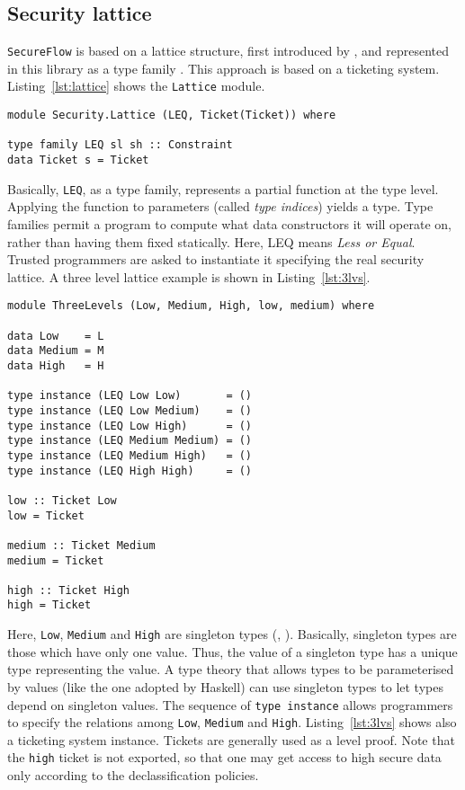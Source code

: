 \subsection{Security lattice}
\texttt{SecureFlow} is based on a lattice structure, first introduced by \citeauthor{denning1976lattice} \cite{denning1976lattice}, and represented in this library as a type family \cite{kiselyov2010fun}. This approach is based on a ticketing system. Listing~\ref{lst:lattice} shows the \texttt{Lattice} module. 
\begin{lstlisting}[caption={The Lattice module}, label={lst:lattice}, breaklines=true]
module Security.Lattice (LEQ, Ticket(Ticket)) where

type family LEQ sl sh :: Constraint
data Ticket s = Ticket
\end{lstlisting}
Basically, \texttt{LEQ}, as a type family, represents a partial function at the type level. Applying the function to parameters (called \textit{type indices}) yields a type. Type families permit a program to compute what data constructors it will operate on, rather than having them fixed statically. Here, LEQ means \textit{Less or Equal}. Trusted programmers are asked to instantiate it specifying the real security lattice. A three level lattice example is shown in Listing~\ref{lst:3lvs}.
\begin{lstlisting}[caption={Three levels lattice}, label={lst:3lvs}, breaklines=true]
module ThreeLevels (Low, Medium, High, low, medium) where

data Low    = L
data Medium = M
data High   = H

type instance (LEQ Low Low)       = ()
type instance (LEQ Low Medium)    = ()
type instance (LEQ Low High)      = ()
type instance (LEQ Medium Medium) = ()
type instance (LEQ Medium High)   = ()
type instance (LEQ High High)     = ()

low :: Ticket Low
low = Ticket

medium :: Ticket Medium
medium = Ticket

high :: Ticket High
high = Ticket
\end{lstlisting}
Here, \texttt{Low}, \texttt{Medium} and \texttt{High} are singleton types (\cite{stone2000singleton}, \cite{pierce2005advanced}). Basically, singleton types are those which have only one value. Thus, the value of a singleton type has a unique type representing the value. A type theory that allows types to be parameterised by values (like the one adopted by Haskell) can use singleton types to let types depend on singleton values. The sequence of \texttt{type instance} allows programmers to specify the relations among \texttt{Low}, \texttt{Medium} and \texttt{High}. Listing~\ref{lst:3lvs} shows also a ticketing system instance. Tickets are generally used as a level proof. Note that the \texttt{high} ticket is not exported, so that one may get access to high secure data only according to the declassification policies. \\

